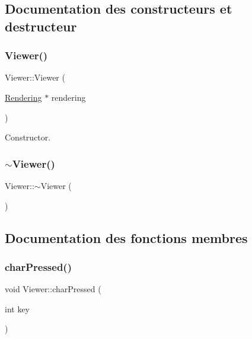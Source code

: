 \subsection{Documentation des constructeurs et destructeur}
\mbox{\label{class_viewer_a29d3e7c2922835cbd92c285c709dbe30}} 
\subsubsection{\texorpdfstring{Viewer()}{Viewer()}}
{\footnotesize\ttfamily Viewer\+::\+Viewer (\begin{DoxyParamCaption}\item[{\hyperlink{class_rendering}{Rendering} $\ast$}]{rendering }\end{DoxyParamCaption})}



Constructor. 

\mbox{\label{class_viewer_a324e5a6a1532fe5eac3f3b0e4792b2da}} 
\subsubsection{\texorpdfstring{$\sim$\+Viewer()}{~Viewer()}}
{\footnotesize\ttfamily Viewer\+::$\sim$\+Viewer (\begin{DoxyParamCaption}{ }\end{DoxyParamCaption})\hspace{0.3cm}{\ttfamily [virtual]}}



\subsection{Documentation des fonctions membres}
\mbox{\label{class_viewer_a12155081915ec2fcf3554534b8aa52d6}} 
\subsubsection{\texorpdfstring{char\+Pressed()}{charPressed()}}
{\footnotesize\ttfamily void Viewer\+::char\+Pressed (\begin{DoxyParamCaption}\item[{int}]{key }\end{DoxyParamCaption})}

